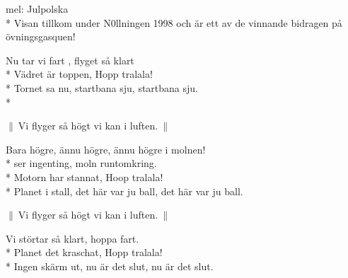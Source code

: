 \begin{SongText}[Molnen]
    \begin{SongInfo}
        mel: Julpolska\\*%
        Visan tillkom under N0llningen 1998 och är ett av de vinnande bidragen på övningsgasquen!
    \end{SongInfo}
    \begin{SongVerse}
        Nu tar vi fart , flyget så klart\\*%
        Vädret är toppen, Hopp tralala!\\*%
        Tornet sa nu, startbana sju, startbana sju.\\*%
    \end{SongVerse}
    \begin{SongVerse}
        $\|\:$Vi flyger så högt vi kan i luften.$\:\|$
    \end{SongVerse}
    \begin{SongVerse}
        Bara högre, ännu högre, ännu högre i molnen!\\*%
        ser ingenting, moln runtomkring.\\*%
        Motorn har stannat, Hoop tralala!\\*%
        Planet i stall, det  här var ju ball, det här var ju ball.
    \end{SongVerse}
    \begin{SongVerse}
        $\|\:$Vi flyger så högt vi kan i luften.$\:\|$
    \end{SongVerse}
    \begin{SongVerse}
        Vi störtar så klart, hoppa  fart.\\*%
        Planet det kraschat, Hopp tralala!\\*%
        Ingen skärm ut, nu är det slut, nu är det slut.
    \end{SongVerse}
\end{SongText}

